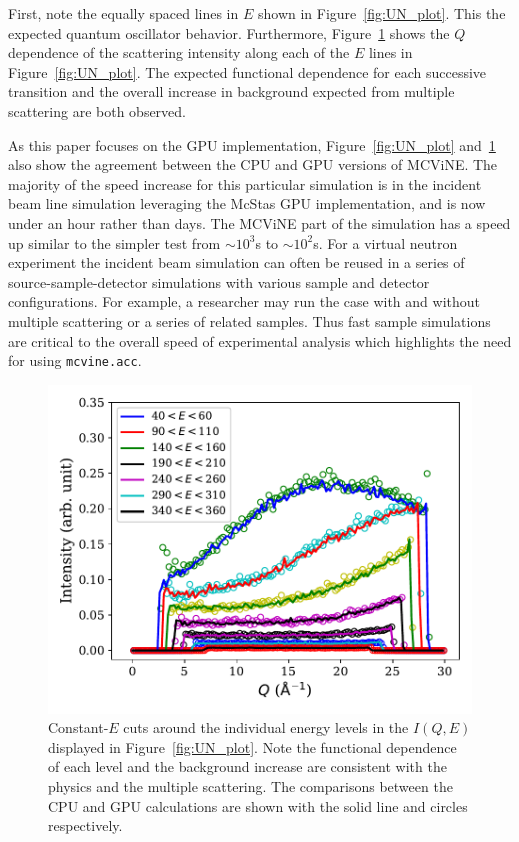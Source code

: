 First, note the equally spaced lines in $E$ shown in Figure~\ref{fig:UN_plot}. This the expected quantum oscillator behavior.
Furthermore, Figure~\ref{fig:UN_cuts} shows the $Q$ dependence of the scattering intensity along each of the $E$ lines in Figure~\ref{fig:UN_plot}.
The expected functional dependence for each successive transition and the overall increase in background expected from multiple scattering are both observed.

As this paper focuses on the GPU implementation, Figure~\ref{fig:UN_plot} and~\ref{fig:UN_cuts} also show the agreement between the CPU and GPU versions of MCViNE.
The majority of the speed increase for this particular simulation is in the incident beam line simulation leveraging the McStas GPU implementation, and is now under an hour rather than days.  
The MCViNE part of the simulation has a speed up similar to the simpler test from $\sim 10^3$s to $\sim 10^2$s.
For a virtual neutron experiment the incident beam simulation can often be reused in a series of source-sample-detector simulations with various sample and detector configurations.
For example, a researcher may run the case with and without multiple scattering or a series of related samples. Thus fast sample simulations are critical to the overall speed of experimental analysis which highlights the need for using \texttt{mcvine.acc}.



\begin{figure}[h]
\centering
\includegraphics[width=\columnwidth]{figures/Constant_E_cuts_high_contrast.pdf}
\caption{Constant-$E$ cuts around the individual energy levels 
in the $I(Q, E)$ displayed in
Figure~\ref{fig:UN_plot}. Note the functional dependence of each level and the background increase are consistent with the physics and the multiple scattering. The comparisons between the CPU and GPU calculations are shown with the solid line and circles respectively.
}
\label{fig:UN_cuts}
\end{figure}


